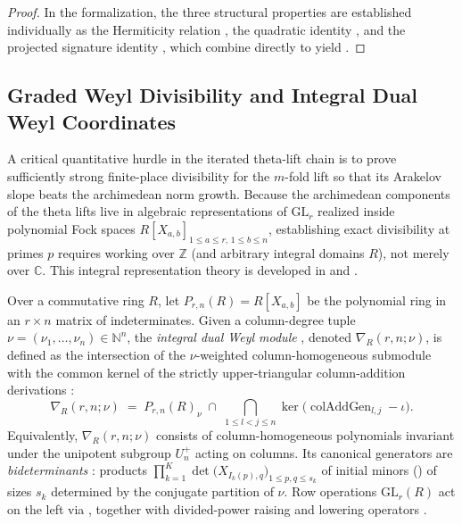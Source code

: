 \begin{proof}
In the formalization, the three structural properties are established
individually as the Hermiticity relation
, the quadratic
identity , and the
projected signature identity ,
which combine directly to yield
.
\end{proof}

\subsection{Graded Weyl Divisibility and Integral Dual Weyl Coordinates}
\label{subsec:ch02-weyl-divisibility}

A critical quantitative hurdle in the iterated theta-lift chain is to prove
sufficiently strong finite-place divisibility for the $m$-fold lift so that
its Arakelov slope beats the archimedean norm growth.
Because the archimedean components of the theta lifts live in algebraic
representations of $\mathrm{GL}_r$ realized inside polynomial Fock spaces
$R[X_{a,b}]_{1 \le a \le r,\, 1 \le b \le n}$, establishing exact divisibility
at primes $p$ requires working over $\mathbb{Z}$ (and arbitrary integral
domains $R$), not merely over $\mathbb{C}$.
This integral representation theory is developed in
 and
.

Over a commutative ring $R$, let $P_{r,n}(R) = R[X_{a,b}]$ be the polynomial
ring in an $r \times n$ matrix of indeterminates.
Given a column-degree tuple $\nu = (\nu_1, \dots, \nu_n) \in \mathbb{N}^n$,
the \emph{integral dual Weyl module}
, denoted
$\nabla_R(r, n; \nu)$, is defined as the intersection of the
$\nu$-weighted column-homogeneous submodule with the common kernel of the
strictly upper-triangular column-addition derivations
:
\[
  \nabla_R(r, n; \nu)
  \;=\;
  P_{r,n}(R)_{\nu} \;\cap\;
  \bigcap_{1 \le l < j \le n}
  \ker\bigl(\operatorname{colAddGen}_{l,j} - \iota\bigr).
\]
Equivalently, $\nabla_R(r, n; \nu)$ consists of column-homogeneous polynomials
invariant under the unipotent subgroup $U_n^+$ acting on columns.
Its canonical generators are \emph{bideterminants}
: products
$\prod_{k=1}^K \det\bigl(X_{I_k(p), q}\bigr)_{1 \le p, q \le s_k}$ of initial
minors () of sizes $s_k$
determined by the conjugate partition of $\nu$.
Row operations $\mathrm{GL}_r(R)$ act on the left via
, together with divided-power
raising and lowering operators .

